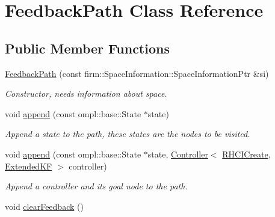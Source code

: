\hypertarget{class_feedback_path}{\section{\-Feedback\-Path \-Class \-Reference}
\label{class_feedback_path}
}
\subsection*{\-Public \-Member \-Functions}
\begin{DoxyCompactItemize}
\item 
\hypertarget{class_feedback_path_aac87c9c760ee3583c7a79bc964b3a156}{\hyperlink{class_feedback_path_aac87c9c760ee3583c7a79bc964b3a156}{\-Feedback\-Path} (const firm\-::\-Space\-Information\-::\-Space\-Information\-Ptr \&si)}\label{class_feedback_path_aac87c9c760ee3583c7a79bc964b3a156}

\begin{DoxyCompactList}\small\item\em \-Constructor, needs information about space. \end{DoxyCompactList}\item 
\hypertarget{class_feedback_path_af5cfe1f344e0e05fc189180930c95356}{void \hyperlink{class_feedback_path_af5cfe1f344e0e05fc189180930c95356}{append} (const ompl\-::base\-::\-State $\ast$state)}\label{class_feedback_path_af5cfe1f344e0e05fc189180930c95356}

\begin{DoxyCompactList}\small\item\em \-Append a state to the path, these states are the nodes to be visited. \end{DoxyCompactList}\item 
\hypertarget{class_feedback_path_a3bc6573cb989802923f92ed311a2dcad}{void \hyperlink{class_feedback_path_a3bc6573cb989802923f92ed311a2dcad}{append} (const ompl\-::base\-::\-State $\ast$state, \hyperlink{class_controller}{\-Controller}$<$ \hyperlink{class_r_h_c_i_create}{\-R\-H\-C\-I\-Create}, \hyperlink{class_extended_k_f}{\-Extended\-K\-F} $>$ controller)}\label{class_feedback_path_a3bc6573cb989802923f92ed311a2dcad}

\begin{DoxyCompactList}\small\item\em \-Append a controller and its goal node to the path. \end{DoxyCompactList}\item 
\hypertarget{class_feedback_path_a6d146f9ba97660395fc94bd93646f759}{void \hyperlink{class_feedback_path_a6d146f9ba97660395fc94bd93646f759}{clear\-Feedback} ()}\label{class_feedback_path_a6d146f9ba97660395fc94bd93646f759}


\end{DoxyCompactItemize}
